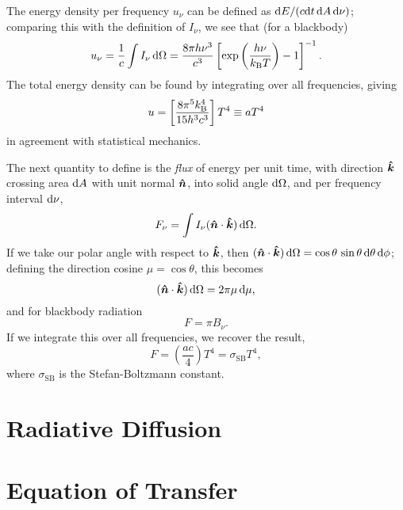 The energy density per frequency $u_{\nu}$ can be defined as $\mathrm{d} E/(c \mathrm{d} t\,\mathrm{d} A\,\mathrm{d}\nu)$; comparing this with the definition of $I_{\nu}$, we see that (for a blackbody)
\begin{equation}\label{e.radiation-energy-density}
u_{\nu} = \frac{1}{c}\int I_{\nu}\,\mathrm{d}\Omega = \frac{8\pi h\nu^{3}}{c^{3}}\left[\exp\left(\frac{h\nu}{k_\mathrm{B} T}\right)-1\right]^{-1}.
\end{equation}
The total energy density can be found by integrating over all frequencies, giving
\[ u = \left[\frac{8\pi^{5}k_\mathrm{B}^{4}}{15 h^{3}c^{3}}\right] T^{4}\equiv aT^{4} \]
in agreement with statistical mechanics.

The next quantity to define is the \emph{flux} of energy per unit time, with direction $\boldsymbol{\hat{k}}$ crossing area $\mathrm{d} A$ with unit normal $\boldsymbol{\hat{n}}$, into solid angle $\mathrm{d}\Omega$, and per frequency interval $\mathrm{d}\nu$,
\begin{equation}\label{e.radiation-flux}
F_{\nu} = \int I_{\nu} (\boldsymbol{\hat{n}}\cdot\boldsymbol{\hat{k}})\,\mathrm{d}\Omega.
\end{equation}
If we take our polar angle with respect to $\boldsymbol{\hat{k}}$, then $(\boldsymbol{\hat{n}}\cdot\boldsymbol{\hat{k}})\,\mathrm{d}\Omega = \cos\theta\,\sin\theta\,\mathrm{d}\theta\,\mathrm{d} \phi$; defining the direction cosine $\mu = \cos\theta$, this becomes 
\[ (\boldsymbol{\hat{n}}\cdot\boldsymbol{\hat{k}})\,\mathrm{d}\Omega = 2\pi \mu\,\mathrm{d}\mu, \]
and for blackbody radiation
\[ F = \pi B_{\nu}.\]
If we integrate this over all frequencies, we recover the result,
\[ F = \left(\frac{ac}{4}\right) T^{4} = \sigma_{\mathrm{SB}} T^{4}, \]
where $\sigma_{\mathrm{SB}}$ is the Stefan-Boltzmann constant.

\section{Radiative Diffusion}

\section{Equation of Transfer}

